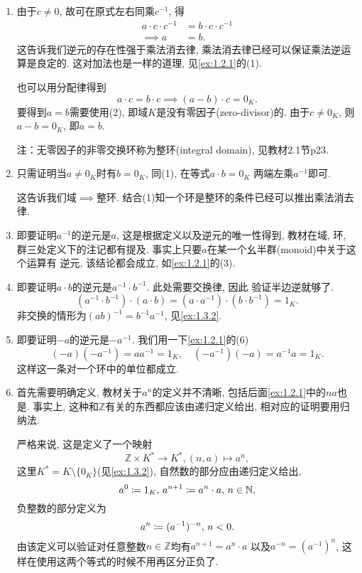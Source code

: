 \begin{solution}
    \begin{enumerate}[(1)]
        \item 由于$c \neq 0$, 故可在原式左右同乘$c^{-1}$, 得 
        \[ 
        \begin{aligned} 
            a \cdot c \cdot c^{-1} &= b \cdot c \cdot c^{-1}\\ 
            \implies a &= b.
        \end{aligned} 
        \]
        这告诉我们逆元的存在性强于乘法消去律, 乘法消去律已经可以保证乘法逆运算是良定的.
        这对加法也是一样的道理, 见\ref{ex:1.2.1}的(1).

        也可以用分配律得到
        \[
            a \cdot c = b \cdot c \implies (a - b) \cdot c = 0_K.
        \]
        要得到$a = b$需要使用(2), 即域$K$是没有零因子(zero-divisor)的. 由于$c \neq 0_K$,
    则$a - b = 0_K$, 即$a = b$.

        注：无零因子的非零交换环称为整环(integral domain), 见教材2.1节p23.
        \item 只需证明当$a \neq 0_K$时有$b = 0_K$, 同(1), 在等式$a \cdot b = 0_K$
    两端左乘$a^{-1}$即可.
        
        这告诉我们域$\implies$整环. 结合(1)知一个环是整环的条件已经可以推出乘法消去律.
        \item 即要证明$a^{-1}$的逆元是$a$, 这是根据定义以及逆元的唯一性得到, 教材在域, 
    环, 群三处定义下的注记都有提及. 事实上只要$a$在某一个幺半群(monoid)中关于这个运算有
    逆元, 该结论都会成立, 如\ref{ex:1.2.1}的(3).
        \item 即要证明$a \cdot b$的逆元是$a^{-1} \cdot b^{-1}$. 此处需要交换律, 因此
    验证半边逆就够了.
    \[
        (a^{-1} \cdot b^{-1}) \cdot (a \cdot b) = (a \cdot a^{-1}) \cdot (b \cdot b^{-1}) = 1_K.
    \]
    非交换的情形为$(ab)^{-1} = b^{-1}a^{-1}$, 见\ref{ex:1.3.2}.
        \item 即要证明$-a$的逆元是$-a^{-1}$. 我们用一下\ref{ex:1.2.1}的(6)
    \[
        (-a)(-a^{-1}) = aa^{-1} = 1_K, \quad (-a^{-1})(-a) = a^{-1}a = 1_K.
    \]
    这样这一条对一个环中的单位都成立.
        \item 首先需要明确定义, 教材关于$a^n$的定义并不清晰, 包括后面\ref{ex:1.2.1}中的$na$也是.
    事实上, 这种和$\mathbb{Z}$有关的东西都应该由递归定义给出, 相对应的证明要用归纳法.
        
        严格来说, 这是定义了一个映射
    \[
        \mathbb{Z} \times K^* \to K^*, (n, a) \mapsto a^n,
    \]
        这里$K^* = K \setminus \{0_K\}$(见\ref{ex:1.3.2}), 自然数的部分应由递归定义给出, 
    \[
        a^0 \mathrel{\coloneqq} 1_K,\, a^{n + 1} \mathrel{\coloneqq} a^n \cdot a,\, n \in \mathbb{N},
    \]
        负整数的部分定义为
    \[
        a^n \mathrel{\coloneqq} (a^{-1})^{-n},\, n < 0. 
    \]
    由该定义可以验证对任意整数$n \in \mathbb{Z}$均有$a^{n + 1} = a^n \cdot a$
    以及$a^{-n} = (a^{-1})^n$, 这样在使用这两个等式的时候不用再区分正负了.


\end{enumerate}
\end{solution}
